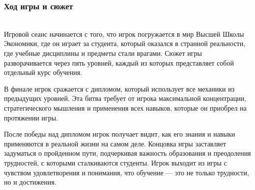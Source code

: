 \subsubsection{Ход игры и сюжет}
    \\Игровой сеанс начинается с того, что игрок погружается в мир Высшей Школы Экономики, где он играет за студента, который оказался в странной реальности, где учебные дисциплины и предметы стали врагами. Сюжет игры разворачивается через пять уровней, каждый из которых представляет собой отдельный курс обучения.\par
    В финале игрок сражается с дипломом, который использует все механики из предыдущих уровней. Эта битва требует от игрока максимальной концентрации, стратегического мышления и применения всех навыков, которые он приобрел на протяжении игры.\par
    После победы над дипломом игрок получает видит, как его знания и навыки применяются в реальной жизни на самом деле. Концовка игры заставляет задуматься о пройденном пути, подчеркивая важность образования и преодоления трудностей, с которыми сталкиваются студенты.
    Игрок выходит из игры с чувством удовлетворения и понимания, что обучение — это не только трудности, но и достижения.
